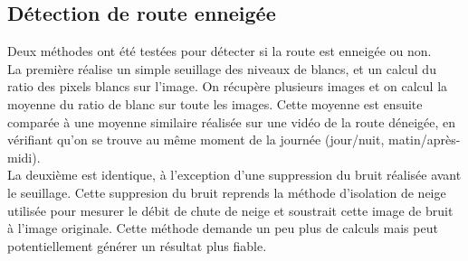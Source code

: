 \newpage

\subsection{Détection de route enneigée} \label{snowOnRoad}
Deux méthodes ont été testées pour détecter si la route est enneigée ou non.\\
La première réalise un simple seuillage des niveaux de blancs, et un calcul
du ratio des pixels blancs sur l'image. On récupère plusieurs images et on
calcul la moyenne du ratio de blanc sur toute les images.
Cette moyenne est ensuite comparée à une moyenne similaire réalisée sur une
vidéo de la route déneigée, en vérifiant qu'on se trouve au même moment de
la journée (jour/nuit, matin/après-midi).\\
La deuxième est identique, à l'exception d'une suppression du bruit réalisée
avant le seuillage. Cette suppresion du bruit reprends la méthode d'isolation
de neige utilisée pour mesurer le débit de chute de neige et soustrait cette image
de bruit à l'image originale. Cette méthode demande un peu plus de calculs mais peut
potentiellement générer un résultat plus fiable.

